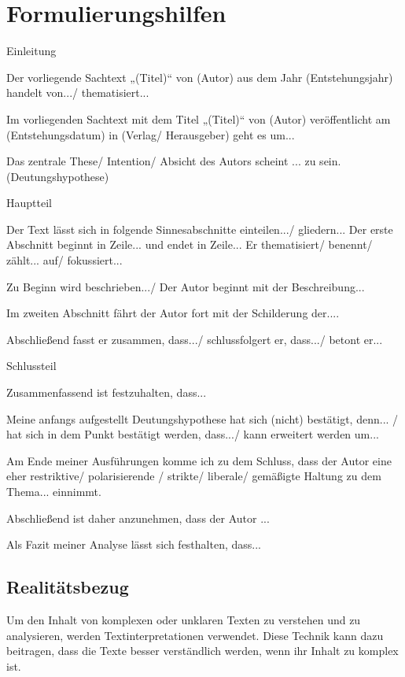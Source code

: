 \section{Formulierungshilfen}   
Einleitung
\begin{compactitem}
    \item Der vorliegende Sachtext „(Titel)“ von (Autor) aus dem Jahr (Entstehungsjahr) handelt von.../ thematisiert... 
    \item Im vorliegenden Sachtext mit dem Titel „(Titel)“ von (Autor) veröffentlicht am (Entstehungsdatum) in (Verlag/ Herausgeber) geht es um... 
    \item Das zentrale These/ Intention/ Absicht des Autors scheint ... zu sein. (Deutungshypothese) 
\end{compactitem}
Hauptteil
\begin{compactitem}
    \item Der Text lässt sich in folgende Sinnesabschnitte einteilen.../ gliedern... Der erste Abschnitt beginnt in Zeile... und endet in Zeile... Er thematisiert/ benennt/ zählt... auf/ fokussiert... 
    \item Zu Beginn wird beschrieben.../ Der Autor beginnt mit der Beschreibung... 
    \item Im zweiten Abschnitt fährt der Autor fort mit der Schilderung der.... 
    \item Abschließend fasst er zusammen, dass.../ schlussfolgert er, dass.../ betont er... 
\end{compactitem}

Schlussteil
\begin{compactitem}
    \item Zusammenfassend ist festzuhalten, dass... 
    \item Meine anfangs aufgestellt Deutungshypothese hat sich (nicht) bestätigt, denn... / hat sich in dem Punkt bestätigt werden, dass.../ kann erweitert werden um... 
    \item Am Ende meiner Ausführungen komme ich zu dem Schluss, dass der Autor eine eher restriktive/ polarisierende / strikte/ liberale/ gemäßigte Haltung zu dem Thema... einnimmt. 
    \item Abschließend ist daher anzunehmen, dass der Autor ... 
    \item Als Fazit meiner Analyse lässt sich festhalten, dass... 
\end{compactitem}

\subsection{Realitätsbezug}
Um den Inhalt von komplexen oder unklaren Texten zu verstehen und zu analysieren, werden Textinterpretationen verwendet. Diese Technik kann dazu beitragen, dass die Texte besser verständlich werden, wenn ihr Inhalt zu komplex ist.

